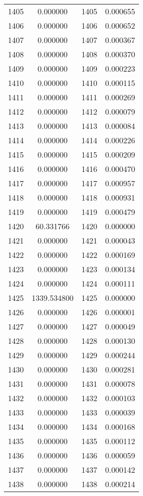 \documentclass[12pt]{article}
\begin{document}
\begin{longtable}{@{}cccc@{}}
1405 & 0.000000 & 1405 & 0.000655 \\
1406 & 0.000000 & 1406 & 0.000652 \\
1407 & 0.000000 & 1407 & 0.000367 \\
1408 & 0.000000 & 1408 & 0.000370 \\
1409 & 0.000000 & 1409 & 0.000223 \\
1410 & 0.000000 & 1410 & 0.000115 \\
1411 & 0.000000 & 1411 & 0.000269 \\
1412 & 0.000000 & 1412 & 0.000079 \\
1413 & 0.000000 & 1413 & 0.000084 \\
1414 & 0.000000 & 1414 & 0.000226 \\
1415 & 0.000000 & 1415 & 0.000209 \\
1416 & 0.000000 & 1416 & 0.000470 \\
1417 & 0.000000 & 1417 & 0.000957 \\
1418 & 0.000000 & 1418 & 0.000931 \\
1419 & 0.000000 & 1419 & 0.000479 \\
1420 & 60.331766 & 1420 & 0.000000 \\
1421 & 0.000000 & 1421 & 0.000043 \\
1422 & 0.000000 & 1422 & 0.000169 \\
1423 & 0.000000 & 1423 & 0.000134 \\
1424 & 0.000000 & 1424 & 0.000111 \\
1425 & 1339.534800 & 1425 & 0.000000 \\
1426 & 0.000000 & 1426 & 0.000001 \\
1427 & 0.000000 & 1427 & 0.000049 \\
1428 & 0.000000 & 1428 & 0.000130 \\
1429 & 0.000000 & 1429 & 0.000244 \\
1430 & 0.000000 & 1430 & 0.000281 \\
1431 & 0.000000 & 1431 & 0.000078 \\
1432 & 0.000000 & 1432 & 0.000103 \\
1433 & 0.000000 & 1433 & 0.000039 \\
1434 & 0.000000 & 1434 & 0.000168 \\
1435 & 0.000000 & 1435 & 0.000112 \\
1436 & 0.000000 & 1436 & 0.000059 \\
1437 & 0.000000 & 1437 & 0.000142 \\
1438 & 0.000000 & 1438 & 0.000214 \\

\end{longtable}
\end{document}
